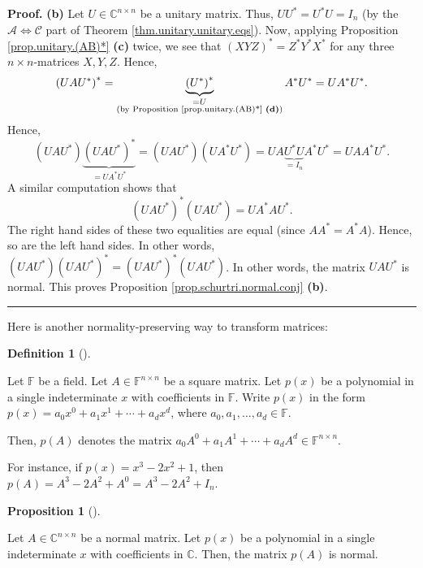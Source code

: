 \documentclass[numbers=enddot,12pt,final,onecolumn,notitlepage]{scrartcl}%
\numberwithin{exer}{subsection}
\theoremstyle{definition}
\newtheorem{prop}[theo]{Proposition}
\newenvironment{proposition}[1][]
{\begin{prop}[#1]\begin{leftbar}}
{\end{leftbar}\end{prop}}
\newtheorem{defi}[theo]{Definition}
\newenvironment{definition}[1][]
{\begin{defi}[#1]\begin{leftbar}}
{\end{leftbar}\end{defi}}
\newenvironment{proof}[1][Proof]{\noindent\textbf{#1.} }{\ \rule{0.5em}{0.5em}}
\begin{document}
\begin{proof}
\textbf{(b)} Let $U\in\mathbb{C}^{n\times n}$ be a unitary matrix. Thus,
$UU^{\ast}=U^{\ast}U=I_{n}$ (by the $\mathcal{A}\Longleftrightarrow
\mathcal{C}$ part of Theorem \ref{thm.unitary.unitary.eqs}). Now, applying
Proposition \ref{prop.unitary.(AB)*} \textbf{(c)} twice, we see that $\left(
XYZ\right)  ^{\ast}=Z^{\ast}Y^{\ast}X^{\ast}$ for any three $n\times
n$-matrices $X,Y,Z$. Hence,%
\[
\left(  UAU^{\ast}\right)  ^{\ast}=\underbrace{\left(  U^{\ast}\right)
^{\ast}}_{\substack{=U\\\text{(by Proposition \ref{prop.unitary.(AB)*}
\textbf{(d)})}}}A^{\ast}U^{\ast}=UA^{\ast}U^{\ast}.
\]
Hence,%
\[
\left(  UAU^{\ast}\right)  \underbrace{\left(  UAU^{\ast}\right)  ^{\ast}%
}_{=UA^{\ast}U^{\ast}}=\left(  UAU^{\ast}\right)  \left(  UA^{\ast}U^{\ast
}\right)  =UA\underbrace{U^{\ast}U}_{=I_{n}}A^{\ast}U^{\ast}=UAA^{\ast}%
U^{\ast}.
\]
A similar computation shows that%
\[
\left(  UAU^{\ast}\right)  ^{\ast}\left(  UAU^{\ast}\right)  =UA^{\ast
}AU^{\ast}.
\]
The right hand sides of these two equalities are equal (since $AA^{\ast
}=A^{\ast}A$). Hence, so are the left hand sides. In other words, $\left(
UAU^{\ast}\right)  \left(  UAU^{\ast}\right)  ^{\ast}=\left(  UAU^{\ast
}\right)  ^{\ast}\left(  UAU^{\ast}\right)  $. In other words, the matrix
$UAU^{\ast}$ is normal. This proves Proposition
\ref{prop.schurtri.normal.conj} \textbf{(b)}.
\end{proof}

Here is another normality-preserving way to transform matrices:

\begin{definition}
\label{def.schurtri.normal.p(A)}Let $\mathbb{F}$ be a field. Let
$A\in\mathbb{F}^{n\times n}$ be a square matrix. Let $p\left(  x\right)  $ be
a polynomial in a single indeterminate $x$ with coefficients in $\mathbb{F}$.
Write $p\left(  x\right)  $ in the form $p\left(  x\right)  =a_{0}x^{0}%
+a_{1}x^{1}+\cdots+a_{d}x^{d}$, where $a_{0},a_{1},\ldots,a_{d}\in\mathbb{F}$.

Then, $p\left(  A\right)  $ denotes the matrix $a_{0}A^{0}+a_{1}A^{1}%
+\cdots+a_{d}A^{d}\in\mathbb{F}^{n\times n}$.
\end{definition}

For instance, if $p\left(  x\right)  =x^{3}-2x^{2}+1$, then $p\left(
A\right)  =A^{3}-2A^{2}+A^{0}=A^{3}-2A^{2}+I_{n}$.

\begin{proposition}
\label{prop.schurtri.normal.p(A)nor}Let $A\in\mathbb{C}^{n\times n}$ be a
normal matrix. Let $p\left(  x\right)  $ be a polynomial in a single
indeterminate $x$ with coefficients in $\mathbb{C}$. Then, the matrix
$p\left(  A\right)  $ is normal.
\end{proposition}
\end{document}
